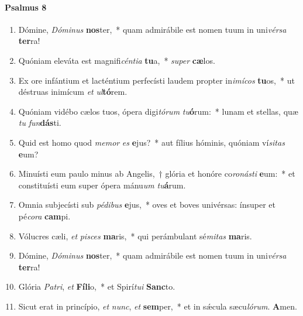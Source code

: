\documentclass[twoside]{article}
\begin{document}
\begin{paracol}[1]{2}
\switchcolumn*

\paragraph{Psalmus 8}


\begin{enumerate}[wide, itemsep=0mm, labelwidth=!, labelindent=0pt, label=\color{gregoriocolor}\theenumi]
\item Dómine, \textit{Dó}\textit{mi}\textit{nus} \textbf{nos}ter,~* quam admirábile est nomen tuum in uni\textit{vér}\textit{sa} \textbf{ter}ra!
\item Quóniam eleváta est magnifi\textit{cén}\textit{ti}\textit{a} \textbf{tu}a,~* \textit{su}\textit{per} \textbf{cæ}los.
\item Ex ore infántium et lacténtium perfecísti laudem propter in\textit{i}\textit{mí}\textit{cos} \textbf{tu}os,~* ut déstruas inimícum \textit{et} \textit{ul}\textbf{tó}rem.
\item Quóniam vidébo cælos tuos, ópera digi\textit{tó}\textit{rum} \textit{tu}\textbf{ó}rum:~* lunam et stellas, quæ \textit{tu} \textit{fun}\textbf{dás}ti.
\item Quid est homo quod \textit{me}\textit{mor} \textit{es} \textbf{e}jus?~* aut fílius hóminis, quóniam ví\textit{si}\textit{tas} \textbf{e}um?
\item Minuísti eum paulo minus ab Angelis,~† glória et honóre co\textit{ro}\textit{nás}\textit{ti} \textbf{e}um:~* et constituísti eum super ópera mánu\textit{um} \textit{tu}\textbf{á}rum.
\item Omnia subjecísti sub \textit{pé}\textit{di}\textit{bus} \textbf{e}jus,~* oves et boves univérsas: ínsuper et pé\textit{co}\textit{ra} \textbf{cam}pi.
\item Vólucres cæli, \textit{et} \textit{pi}\textit{sces} \textbf{ma}ris,~* qui perámbulant sé\textit{mi}\textit{tas} \textbf{ma}ris.
\item Dómine, \textit{Dó}\textit{mi}\textit{nus} \textbf{nos}ter,~* quam admirábile est nomen tuum in uni\textit{vér}\textit{sa} \textbf{ter}ra!
\item Glória \textit{Pa}\textit{tri}, \textit{et} \textbf{Fí}\textbf{li}o,~* et Spirí\textit{tu}\textit{i} \textbf{Sanc}to.
\item Sicut erat in princípio, \textit{et} \textit{nunc}, \textit{et} \textbf{sem}per,~* et in sǽcula sæcu\textit{ló}\textit{rum}. \textbf{A}men.
\end{enumerate}


\end{paracol}
\end{document}
